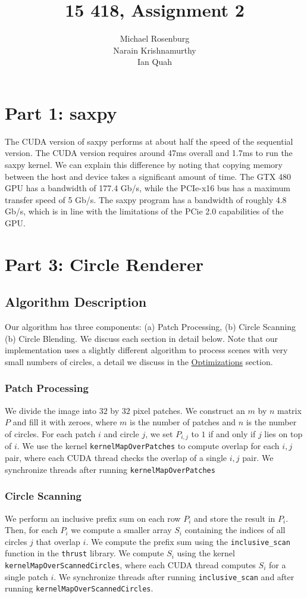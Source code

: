 \documentclass{article}
\title{15 418, Assignment 2}
\author{Michael Rosenburg \\ Narain Krishnamurthy \\ Ian Quah}
\begin{document}
\maketitle

\section{Part 1: saxpy}
The CUDA version of saxpy performs at about half the speed of the sequential version. The CUDA version requires around 47ms overall and 1.7ms to run the saxpy kernel. We can explain this difference by noting that copying memory between the host and device takes a significant amount of time. The GTX 480 GPU has a bandwidth of 177.4 Gb/s, while the PCIe-x16 bus has a maximum transfer speed of 5 Gb/s. The saxpy program has a bandwidth of roughly 4.8 Gb/s, which is in line with the limitations of the PCie 2.0 capabilities of the GPU. 

\section{Part 3: Circle Renderer}
\subsection{Algorithm Description}
Our algorithm has three components: (a) Patch Processing, (b) Circle Scanning (b) Circle Blending. We discuss each section in detail below. Note that our implementation uses a slightly different algorithm to process scenes with very small numbers of circles, a detail we discuss in the \hyperref[sec:optimizations]{Optimizations} section. 

\subsubsection{Patch Processing}
We divide the image into $32$ by $32$ pixel patches. We construct an $m$ by $n$ matrix $P$ and fill it with zeroes, where $m$ is the number of patches and $n$ is the number of circles. For each patch $i$ and circle $j$, we set $P_{i,j}$ to $1$ if and only if $j$ lies on top of $i$. We use the kernel \verb+kernelMapOverPatches+ to compute overlap for each $i,j$ pair, where each CUDA thread checks the overlap of a single $i,j$ pair. We synchronize threads after running \verb+kernelMapOverPatches+ 

\subsubsection{Circle Scanning}
We perform an inclusive prefix sum on each row $P_i$ and store the result in $P_i$. Then, for each $P_i$ we compute a smaller array $S_i$ containing the indices of all circles $j$ that overlap $i$. We compute the prefix sum using the \verb+inclusive_scan+ function in the \verb+thrust+ library. We compute $S_i$ using the kernel \\\verb+kernelMapOverScannedCircles+, where each CUDA thread computes $S_i$ for a single patch $i$. We synchronize threads after running \verb+inclusive_scan+ and after running \verb+kernelMapOverScannedCircles+. 
\end{document}
